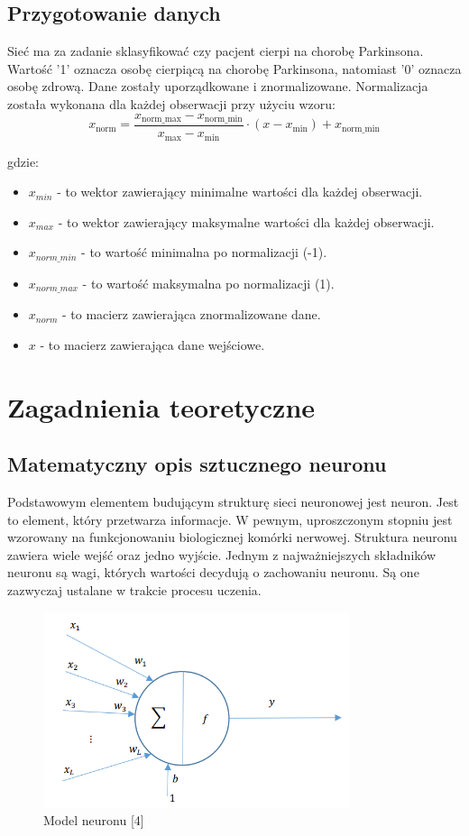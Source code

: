 \documentclass{article}
\begin{document}
\subsection{Przygotowanie danych}
Sieć ma za zadanie sklasyfikować czy pacjent cierpi na chorobę Parkinsona. Wartość '1' oznacza osobę cierpiącą na chorobę Parkinsona, natomiast '0' oznacza osobę zdrową.
Dane zostały uporządkowane i znormalizowane.
Normalizacja została wykonana dla każdej obserwacji przy użyciu wzoru:
\[
    x_{\text{norm}} = \frac{{x_{\text{norm\_max}} - x_{\text{norm\_min}}}}{{x_{\text{max}} - x_{\text{min}}}} \cdot (x - x_{\text{min}}) + x_{\text{norm\_min}}
\]

gdzie:
\begin{itemize}
    \item $x_{min}$ - to wektor zawierający minimalne wartości dla każdej obserwacji.
    \item $x_{max}$ - to wektor zawierający maksymalne wartości dla każdej obserwacji.
    \item $x_{norm\_min}$ - to wartość minimalna po normalizacji (-1).
    \item $x_{norm\_max}$ - to wartość maksymalna po normalizacji (1).
    \item $x_{norm}$ - to macierz zawierająca znormalizowane dane.
    \item $x$ - to macierz zawierająca dane wejściowe.
\end{itemize}
\section{Zagadnienia teoretyczne}
\subsection{Matematyczny opis sztucznego neuronu}
Podstawowym elementem budującym strukturę sieci neuronowej jest neuron. Jest to element, który przetwarza informacje.
W pewnym, uproszczonym stopniu jest wzorowany na funkcjonowaniu biologicznej komórki nerwowej.
Struktura neuronu zawiera wiele wejść oraz jedno wyjście.
Jednym z najważniejszych składników neuronu są wagi, których wartości decydują o zachowaniu neuronu. Są one zazwyczaj ustalane w trakcie procesu uczenia.
\begin{figure}[H]
    \centering
    \includegraphics[width=0.8\textwidth, keepaspectratio]{model_neuronu.png}
    \caption{Model neuronu [4]}
    \label{fig:zdjecie}
\end{figure}
\end{document}
